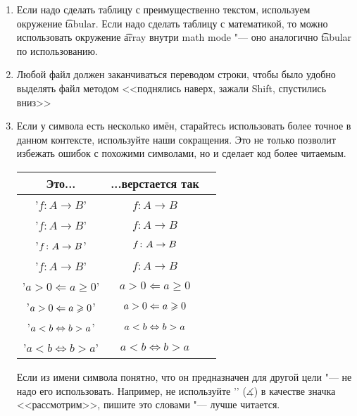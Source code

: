 \begin{enumerate}
\item
	Если надо сделать таблицу с преимущественно текстом, используем окружение \t{tabular}.
	Если надо сделать таблицу с математикой, то можно использовать окружение \t{array}
	внутри math mode "--- оно аналогично \t{tabular} по использованию.

\item
	Любой файл должен заканчиваться переводом строки, чтобы было удобно выделять файл
	методом <<поднялись наверх, зажали Shift, спустились вниз>>

\item
	Если у символа есть несколько имён, старайтесь использовать более точное в данном контексте,
	используйте наши сокращения.
	Это не только позволит избежать ошибок с похожими символами, но и сделает код более читаемым.
	\begin{center}\begin{tabular}{|c|c|c|}
		\hline Это... & ...верстается так & \\
		\hline \tex'$f\colon A \xrightarrow{} B$' & $f\colon A \xrightarrow{} B$ \bad \\
		\hline \tex'$f\colon A \rightarrow B$' & $f\colon A \rightarrow B$ \bad \\
		\hline \tex'$f\colon A \rightarrow B$' & $f\colon A \rightarrow B$ \bad \\
		\hline \tex'$f\colon A \to B$' & $f\colon A \to B$ \ok \\
		\hline \tex'$a>0 \Leftarrow a \ge 0$' & $a>0 \Leftarrow a \ge 0$ \bad \\
		\hline \tex'$a>0 \Leftarrow a \geqslant 0$' & $a>0 \Leftarrow a \geqslant 0$ \ok \\
		\hline \tex'$a<b \Leftrightarrow b>a$' & $a<b \Leftrightarrow b>a$ \bad \\
		\hline \tex'$a<b \iff b>a$' & $a<b \iff b>a$ \ok \\
		\hline
	\end{tabular}\end{center}
	Если из имени символа понятно, что он предназначен для другой цели "--- не надо его использовать.
	Например, не используйте \tex'\measuredangle' ($\measuredangle$) в качестве значка <<рассмотрим>>,
	пишите это словами "--- лучше читается.

\end{enumerate}

